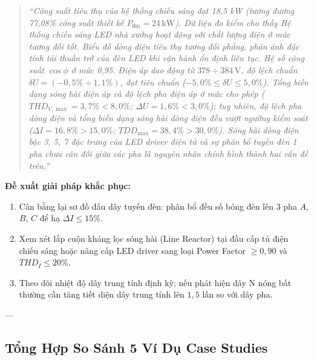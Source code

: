 \documentclass[12pt,a4paper]{article}
\begin{document}
\begin{quote}\itshape
``Công suất tiêu thụ của hệ thống chiếu sáng đạt 18,5 kW (tương đương 77,08\% công suất thiết kế $P_{\text{đm}} = 24\,\mathrm{kW}$). Dữ liệu đo kiểm cho thấy Hệ thống chiếu sáng LED nhà xưởng hoạt động với chất lượng điện ở mức tương đối tốt. Biểu đồ dòng điện tiêu thụ tương đối phẳng, phản ánh đặc tính tải thuần trở của đèn LED khi vận hành ổn định liên tục. Hệ số công suất $\cos\phi$ ở mức 0,95. Điện áp dao động từ $378 \div 384\,\mathrm{V}$, độ lệch chuẩn $\delta U = (-0{,}5\% \div 1{,}1\%)$, đạt tiêu chuẩn ($-5{,}0\% \le \delta U \le 5{,}0\%$). Tổng biến dạng sóng hài điện áp và độ lệch pha điện áp ở mức cho phép ($THD_{V,\max} = 3{,}7\% < 8{,}0\%$; $\Delta U = 1{,}6\% < 3{,}0\%$); tuy nhiên, độ lệch pha dòng điện và tổng biến dạng sóng hài dòng điện đều vượt ngưỡng kiểm soát ($\Delta I = 16{,}8\% > 15{,}0\%$; $TDD_{\max} = 38{,}4\% > 30{,}0\%$). Sóng hài dòng điện bậc 3, 5, 7 đặc trưng của LED driver điện tử và sự phân bổ tuyến đèn 1 pha chưa cân đối giữa các pha là nguyên nhân chính hình thành hai vấn đề trên.''
\end{quote}

\textbf{Đề xuất giải pháp khắc phục:}
\begin{enumerate}
  \item Cân bằng lại sơ đồ đấu dây tuyến đèn: phân bổ đều số bóng đèn lên 3 pha $A$, $B$, $C$ để hạ $\Delta I \le 15\%$.
  \item Xem xét lắp cuộn kháng lọc sóng hài (Line Reactor) tại đầu cấp tủ điện chiếu sáng hoặc nâng cấp LED driver sang loại Power Factor $\ge 0{,}90$ và $THD_I \le 20\%$.
  \item Theo dõi nhiệt độ dây trung tính định kỳ; nếu phát hiện dây N nóng bất thường cần tăng tiết diện dây trung tính lên $1{,}5$ lần so với dây pha.
\end{enumerate}

---

\subsection{Tổng Hợp So Sánh 5 Ví Dụ Case Studies}
\end{document}
